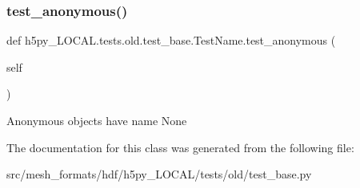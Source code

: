 \subsubsection{\texorpdfstring{test\+\_\+anonymous()}{test\_anonymous()}}
{\footnotesize\ttfamily def h5py\+\_\+\+L\+O\+C\+A\+L.\+tests.\+old.\+test\+\_\+base.\+Test\+Name.\+test\+\_\+anonymous (\begin{DoxyParamCaption}\item[{}]{self }\end{DoxyParamCaption})}

\begin{DoxyVerb}Anonymous objects have name None \end{DoxyVerb}
 

The documentation for this class was generated from the following file\+:\begin{DoxyCompactItemize}
\item 
src/mesh\+\_\+formats/hdf/h5py\+\_\+\+L\+O\+C\+A\+L/tests/old/test\+\_\+base.\+py\end{DoxyCompactItemize}
